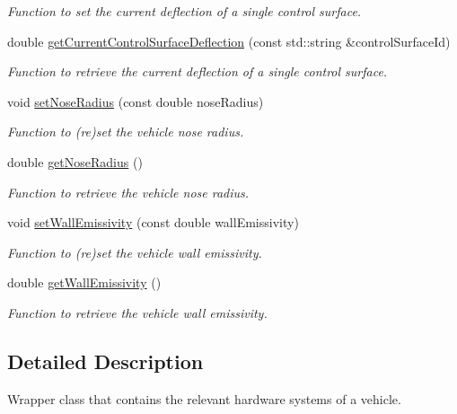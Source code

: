 \begin{DoxyCompactItemize}
\begin{DoxyCompactList}\small\item\em Function to set the current deflection of a single control surface. \end{DoxyCompactList}\item 
double \hyperlink{classtudat_1_1system__models_1_1VehicleSystems_a68510241c2af9ba0b05e922fdafa1be7}{get\+Current\+Control\+Surface\+Deflection} (const std\+::string \&control\+Surface\+Id)
\begin{DoxyCompactList}\small\item\em Function to retrieve the current deflection of a single control surface. \end{DoxyCompactList}\item 
void \hyperlink{classtudat_1_1system__models_1_1VehicleSystems_a6053ba75d0a3fbd618a0e4dabdc22635}{set\+Nose\+Radius} (const double nose\+Radius)
\begin{DoxyCompactList}\small\item\em Function to (re)set the vehicle nose radius. \end{DoxyCompactList}\item 
double \hyperlink{classtudat_1_1system__models_1_1VehicleSystems_aa66a21c1a6096701d4396de981d3f268}{get\+Nose\+Radius} ()
\begin{DoxyCompactList}\small\item\em Function to retrieve the vehicle nose radius. \end{DoxyCompactList}\item 
void \hyperlink{classtudat_1_1system__models_1_1VehicleSystems_a336efcac875c575d2627be9d1d756adb}{set\+Wall\+Emissivity} (const double wall\+Emissivity)
\begin{DoxyCompactList}\small\item\em Function to (re)set the vehicle wall emissivity. \end{DoxyCompactList}\item 
double \hyperlink{classtudat_1_1system__models_1_1VehicleSystems_a52daa570a304ad4287e482508d2833e2}{get\+Wall\+Emissivity} ()
\begin{DoxyCompactList}\small\item\em Function to retrieve the vehicle wall emissivity. \end{DoxyCompactList}\end{DoxyCompactItemize}


\subsection{Detailed Description}
Wrapper class that contains the relevant hardware systems of a vehicle. 

